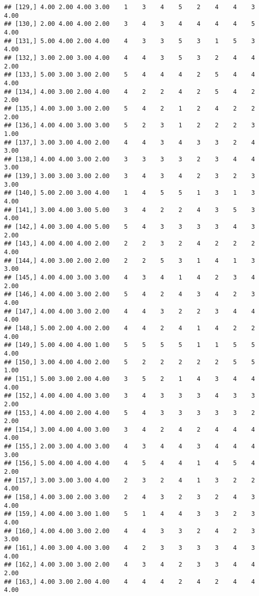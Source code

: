 \documentclass[]{article}
\begin{document}
\begin{verbatim}
## [129,] 4.00 2.00 4.00 3.00    1    3    4    5    2    4    4    3 4.00
## [130,] 2.00 4.00 4.00 2.00    3    4    3    4    4    4    4    5 4.00
## [131,] 5.00 4.00 2.00 4.00    4    3    3    5    3    1    5    3 4.00
## [132,] 3.00 2.00 3.00 4.00    4    4    3    5    3    2    4    4 2.00
## [133,] 5.00 3.00 3.00 2.00    5    4    4    4    2    5    4    4 4.00
## [134,] 4.00 3.00 2.00 4.00    4    2    2    4    2    5    4    2 2.00
## [135,] 4.00 3.00 3.00 2.00    5    4    2    1    2    4    2    2 2.00
## [136,] 4.00 4.00 3.00 3.00    5    2    3    1    2    2    2    3 1.00
## [137,] 3.00 3.00 4.00 2.00    4    4    3    4    3    3    2    4 3.00
## [138,] 4.00 4.00 3.00 2.00    3    3    3    3    2    3    4    4 3.00
## [139,] 3.00 3.00 3.00 2.00    3    4    3    4    2    3    2    3 3.00
## [140,] 5.00 2.00 3.00 4.00    1    4    5    5    1    3    1    3 4.00
## [141,] 3.00 4.00 3.00 5.00    3    4    2    2    4    3    5    3 4.00
## [142,] 4.00 3.00 4.00 5.00    5    4    3    3    3    3    4    3 2.00
## [143,] 4.00 4.00 4.00 2.00    2    2    3    2    4    2    2    2 4.00
## [144,] 4.00 3.00 2.00 2.00    2    2    5    3    1    4    1    3 3.00
## [145,] 4.00 4.00 3.00 3.00    4    3    4    1    4    2    3    4 2.00
## [146,] 4.00 4.00 3.00 2.00    5    4    2    4    3    4    2    3 4.00
## [147,] 4.00 4.00 3.00 2.00    4    4    3    2    2    3    4    4 4.00
## [148,] 5.00 2.00 4.00 2.00    4    4    2    4    1    4    2    2 4.00
## [149,] 5.00 4.00 4.00 1.00    5    5    5    5    1    1    5    5 4.00
## [150,] 3.00 4.00 4.00 2.00    5    2    2    2    2    2    5    5 1.00
## [151,] 5.00 3.00 2.00 4.00    3    5    2    1    4    3    4    4 4.00
## [152,] 4.00 4.00 4.00 3.00    3    4    3    3    3    4    3    3 2.00
## [153,] 4.00 4.00 2.00 4.00    5    4    3    3    3    3    3    2 2.00
## [154,] 3.00 4.00 4.00 3.00    3    4    2    4    2    4    4    4 4.00
## [155,] 2.00 3.00 4.00 3.00    4    3    4    4    3    4    4    4 3.00
## [156,] 5.00 4.00 4.00 4.00    4    5    4    4    1    4    5    4 2.00
## [157,] 3.00 3.00 3.00 4.00    2    3    2    4    1    3    2    2 4.00
## [158,] 4.00 3.00 2.00 3.00    2    4    3    2    3    2    4    3 4.00
## [159,] 4.00 4.00 3.00 1.00    5    1    4    4    3    3    2    3 4.00
## [160,] 4.00 4.00 3.00 2.00    4    4    3    3    2    4    2    3 3.00
## [161,] 4.00 3.00 4.00 3.00    4    2    3    3    3    3    4    3 4.00
## [162,] 4.00 3.00 3.00 2.00    4    3    4    2    3    3    4    4 2.00
## [163,] 4.00 3.00 2.00 4.00    4    4    4    2    4    2    4    4 4.00

\end{verbatim}
\end{document}
